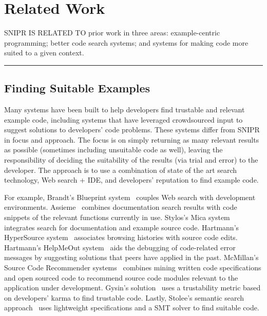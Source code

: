 \chapter{Related Work}{}
\label{sec:related}

\lettrine[lraise=0.1, nindent=0em, slope=-.5em]{S} {NIPR IS RELATED TO} prior work in three areas: example-centric programming; better code search systems; and systems for making code more suited to a given context.

\fancybreak{\pfbreakdisplay}

\section{Finding Suitable Examples}
\label{sec:codesearch}

Many systems have been built to help developers find trustable and relevant example code, including systems that have leveraged crowdsourced input to suggest solutions to developers' code problems. These systems differ from \uppercase{SnipR} in focus and approach. The focus is on simply returning as many relevant results as possible (sometimes including unsuitable code as well), leaving the responsibility of deciding the suitability of the results (via trial and error) to the developer. The approach is to use a combination of state of the art search technology, Web search + IDE, and developers' reputation to find example code.   

For example, Brandt’s Blueprint system~\cite{Brandt:2010tp} couples Web search with development environments. Assieme~\cite{Hoffmann:2007wo} combines documentation search results with code snippets of the relevant functions currently in use. Stylos's Mica system~\cite{Stylos:2006gu} integrates search for documentation and example source code. Hartmann's HyperSource system~\cite{Hartmann:2011ii} associates browsing histories with source code edits. Hartmann's HelpMeOut system~\cite{Hartmann:2010hx} aids the debugging of code-related error messages by suggesting solutions that peers have applied in the past. McMillan's Source Code Recommender systems~\cite{McMillan:2012dj} combines mining written code specifications and open sourced code to recommend source code modules relevant to the application under development. Gysin's solution~\cite{Gysin:2010kt} uses a trustability metric based on developers' karma to find trustable code. Lastly, Stolee's semantic search approach~\cite{Stolee:2012wp} uses lightweight specifications and a SMT solver to find suitable code.

